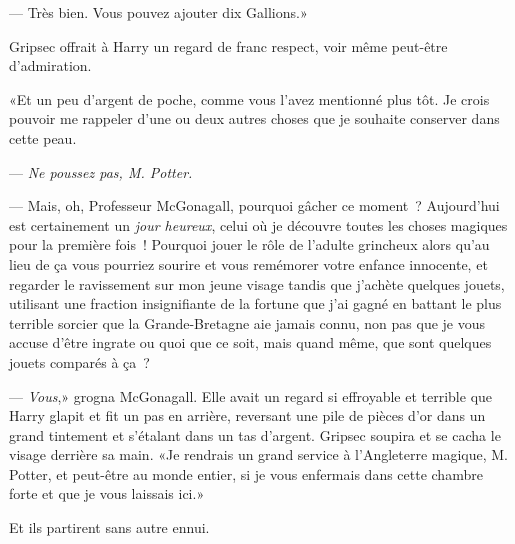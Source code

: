 --- Très bien. Vous pouvez ajouter dix Gallions.»

Gripsec offrait à Harry un regard de franc respect, voir même peut-être d'admiration.

«Et un peu d'argent de poche, comme vous l'avez mentionné plus tôt. Je crois pouvoir me rappeler d'une ou deux autres choses que je souhaite conserver dans cette peau.

--- \emph{Ne poussez pas, M. Potter.}

--- Mais, oh, Professeur McGonagall, pourquoi gâcher ce moment~? Aujourd'hui est certainement un \emph{jour heureux}, celui où je découvre toutes les choses magiques pour la première fois~! Pourquoi jouer le rôle de l'adulte grincheux alors qu'au lieu de ça vous pourriez sourire et vous remémorer votre enfance innocente, et regarder le ravissement sur mon jeune visage tandis que j'achète quelques jouets, utilisant une fraction insignifiante de la fortune que j'ai gagné en battant le plus terrible sorcier que la Grande-Bretagne aie jamais connu, non pas que je vous accuse d'être ingrate ou quoi que ce soit, mais quand même, que sont quelques jouets comparés à ça~?

--- \emph{Vous},» grogna McGonagall. Elle avait un regard si effroyable et terrible que Harry glapit et fit un pas en arrière, reversant une pile de pièces d'or dans un grand tintement et s'étalant dans un tas d'argent. Gripsec soupira et se cacha le visage derrière sa main. «Je rendrais un grand service à l'Angleterre magique, M. Potter, et peut-être au monde entier, si je vous enfermais dans cette chambre forte et que je vous laissais ici.»

Et ils partirent sans autre ennui.

